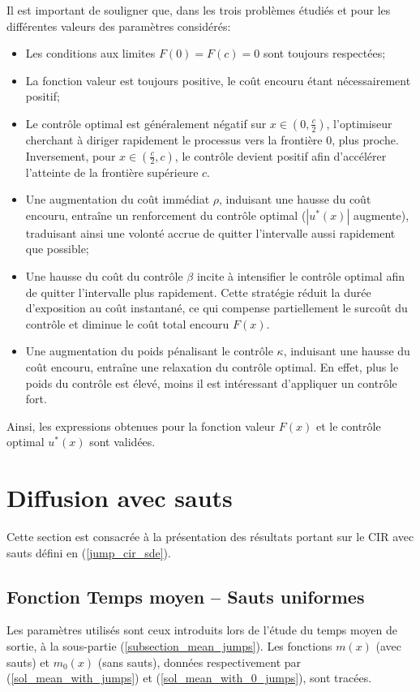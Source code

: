 Il est important de souligner que, dans les trois problèmes étudiés et pour les différentes valeurs des paramètres considérés:
\begin{itemize}
    \item Les conditions aux limites $F(0)=F(c)=0$ sont toujours respectées;
    \item La fonction valeur est toujours positive, le coût encouru étant nécessairement positif;
    \item Le contrôle optimal est généralement négatif sur \( x \in \left(0, \frac{c}{2}\right) \), l'optimiseur cherchant à diriger rapidement le processus vers la frontière \( 0 \), plus proche. Inversement, pour \( x \in \left(\frac{c}{2}, c\right) \), le contrôle devient positif afin d'accélérer l'atteinte de la frontière supérieure \( c \).
    \item Une augmentation du coût immédiat $\rho$, induisant une hausse du coût encouru, entraîne un renforcement du contrôle optimal ($|u^*(x)|$ augmente), traduisant ainsi une volonté accrue de quitter l'intervalle aussi rapidement que possible;
    \item Une hausse du coût du contrôle $\beta$ incite à intensifier le contrôle optimal afin de quitter l'intervalle plus rapidement. Cette stratégie réduit la durée d'exposition au coût instantané, ce qui compense partiellement le surcoût du contrôle et diminue le coût total encouru $F(x)$.
    \item Une augmentation du poids pénalisant le contrôle $\kappa$, induisant une hausse du coût encouru, entraîne une relaxation du contrôle optimal. En effet, plus le poids du contrôle est élevé, moins il est intéressant d'appliquer un contrôle fort.
\end{itemize}
Ainsi, les expressions obtenues pour la fonction valeur $F(x)$ et le contrôle optimal $u^*(x)$ sont validées.

\section{Diffusion avec sauts}

Cette section est consacrée à la présentation des résultats portant sur le \acs{CIR} avec sauts défini en (\ref{jump_cir_sde}).
\subsection{Fonction Temps moyen -- Sauts uniformes}
Les paramètres utilisés sont ceux introduits lors de l'étude du temps moyen de sortie, à la sous-partie (\ref{subsection_mean_jumps}). Les fonctions \( m(x) \) (avec sauts) et \( m_0(x) \) (sans sauts), données respectivement par (\ref{sol_mean_with_jumps}) et (\ref{sol_mean_with_0_jumps}), sont tracées.
